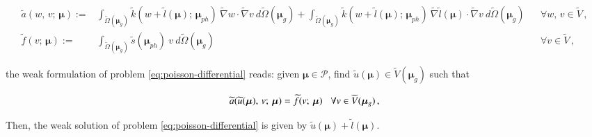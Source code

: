 \documentclass[longtitle]{elsarticle}
\numberwithin{equation}{section}
\theoremstyle{theorem}
\theoremstyle{definition}
\theoremstyle{remark}
\theoremstyle{proposition}
\numberwithin{figure}{section}
\newcommand{\wt}[1]{\widetilde{#1}}
\newcommand{\bg}[1]{\boldsymbol{#1}}
\begin{document}
		\begin{linenomath}\begin{linenomath}\begin{equation}
			\label{eq:poisson-weak-forms}
			\begin{aligned}
				\wt{a}(w, \, v; \, \bg{\mu}) := & \int_{\wt{\Omega}(\bg{\mu}_g)} \wt{k}(w + \wt{l}(\bg{\mu}); \, \bg{\mu}_{ph}) ~ \wt{\nabla} w \cdot \wt{\nabla} v ~ d\wt{\Omega}(\bg{\mu}_g) + \int_{\wt{\Omega}(\bg{\mu}_g)} \wt{k}(w + \wt{l}(\bg{\mu}); \, \bg{\mu}_{ph}) ~ \wt{\nabla} \wt{l}(\bg{\mu}) \cdot \wt{\nabla} v ~ d\wt{\Omega}(\bg{\mu}_g) && \forall w, \, v \in \wt{V} \, , \\
				\wt{f}(v; \, \bg{\mu}) := & \int_{\wt{\Omega}(\bg{\mu}_g)} \wt{s}(\bg{\mu}_{ph}) ~ v ~ d\wt{\Omega}(\bg{\mu}_g) && \forall v \in \wt{V} \, ,
			\end{aligned}
		\end{equation}\end{linenomath}\end{linenomath}
		the weak formulation of problem \eqref{eq:poisson-differential} reads: given $\bg{\mu} \in \mathcal{P}$, find $\wt{u}(\bg{\mu}) \in \wt{V}(\bg{\mu}_g)$ such that
		\begin{linenomath}\begin{linenomath}\begin{equation}
			\label{eq:poisson-weak}
			\wt{a}(\wt{u}(\bg{\mu}), \, v; \, \bg{\mu}) = \wt{f}(v; \, \bg{\mu}) \hspace*{0.3cm} \forall v \in \wt{V}(\bg{\mu}_g) \, , 
		\end{equation}\end{linenomath}\end{linenomath}
		Then, the weak solution of problem \eqref{eq:poisson-differential} is given by $\wt{u}(\bg{\mu}) + \wt{l}(\bg{\mu})$. 
\end{document}
